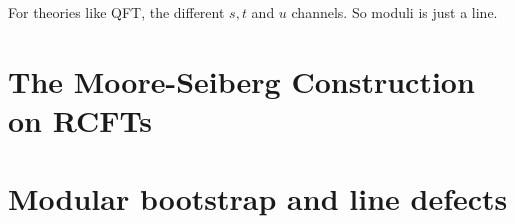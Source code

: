 \documentclass[10pt,
 article,
 amsmath,amssymb
]{revtex4-2}
\begin{document}
For theories like QFT, the different $s,t$ and $u$ channels. So moduli is just a line.




\section{The Moore-Seiberg Construction on RCFTs}

\section{Modular bootstrap and line defects}
\end{document}
